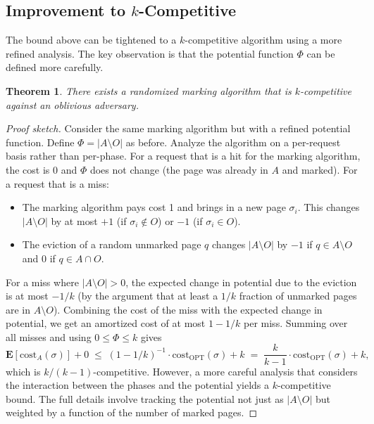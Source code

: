 \documentclass[twoside,12pt]{book}
\theoremstyle{plain}
\newtheorem{theorem}{Theorem}[chapter]
\theoremstyle{definition}
\theoremstyle{remark}
\begin{document}
\subsection{Improvement to \texorpdfstring{$k$}{k}-Competitive}

The bound above can be tightened to a $k$-competitive algorithm using a
more refined analysis.  The key observation is that the potential
function $\Phi$ can be defined more carefully.

\begin{theorem}\label{thm:marking-k}
There exists a randomized marking algorithm that is $k$-competitive
against an oblivious adversary.
\end{theorem}

\begin{proof}[Proof sketch]
Consider the same marking algorithm but with a refined potential function.
Define $\Phi = |A \setminus O|$ as before.  Analyze the algorithm on a
per-request basis rather than per-phase.  For a request that is a hit
for the marking algorithm, the cost is 0 and $\Phi$ does not change (the
page was already in $A$ and marked).  For a request that is a miss:

\begin{itemize}[nosep]
  \item The marking algorithm pays cost 1 and brings in a new page
        $\sigma_i$.  This changes $|A \setminus O|$ by at most $+1$ (if
        $\sigma_i \notin O$) or $-1$ (if $\sigma_i \in O$).
  \item The eviction of a random unmarked page $q$ changes $|A \setminus
        O|$ by $-1$ if $q \in A \setminus O$ and $0$ if $q \in A \cap
        O$.
\end{itemize}

For a miss where $|A \setminus O| > 0$, the expected change in potential
due to the eviction is at most $-1/k$ (by the argument that at least a
$1/k$ fraction of unmarked pages are in $A \setminus O$).  Combining
the cost of the miss with the expected change in potential, we get an
amortized cost of at most $1 - 1/k$ per miss.  Summing over all
misses and using $0 \le \Phi \le k$ gives
\[
  \mathbf{E}[\mathrm{cost}_A(\sigma)] + 0 \;\le\; (1 - 1/k)^{-1} \cdot \mathrm{cost}_{\mathrm{OPT}}(\sigma) + k \;=\; \frac{k}{k-1} \cdot \mathrm{cost}_{\mathrm{OPT}}(\sigma) + k,
\]
which is $k/(k-1)$-competitive.  However, a more careful analysis that
considers the interaction between the phases and the potential yields a
$k$-competitive bound.  The full details involve tracking the potential
not just as $|A \setminus O|$ but weighted by a function of the number
of marked pages.
\end{proof}
\end{document}
